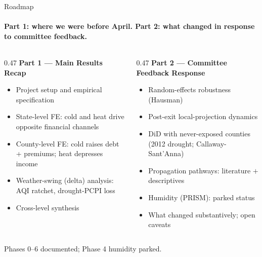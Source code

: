\documentclass[aspectratio=169,11pt]{beamer}
\newcommand{\tealtext}[1]{{\color{Teal}#1}}
\newcommand{\graytext}[1]{{\color{WarmGray}#1}}
\begin{document}
\begin{frame}{Roadmap}
  \framesubtitle{Part 1: where we were before April. Part 2: what changed in response to committee feedback.}
  \begin{columns}[T]
    \begin{column}{0.47\textwidth}
      \textbf{\tealtext{Part 1 --- Main Results Recap}}
      \begin{itemize}\itemsep0.16em
        \item Project setup and empirical specification
        \item State-level FE: cold and heat drive opposite financial channels
        \item County-level FE: cold raises debt + premiums; heat depresses income
        \item Weather-swing (delta) analysis: AQI ratchet, drought-PCPI loss
        \item Cross-level synthesis
      \end{itemize}
    \end{column}
    \begin{column}{0.47\textwidth}
      \textbf{\tealtext{Part 2 --- Committee Feedback Response}}
      \begin{itemize}\itemsep0.16em
        \item Random-effects robustness (Hausman)
        \item Post-exit local-projection dynamics
        \item DiD with never-exposed counties (2012 drought; Callaway-Sant'Anna)
        \item Propagation pathways: literature \(+\) descriptives
        \item Humidity (PRISM): parked status
        \item What changed substantively; open caveats
      \end{itemize}
    \end{column}
  \end{columns}
  \vspace{0.2em}
  \begin{center}
    \graytext{\scriptsize Phases 0--6 documented; Phase 4 humidity parked.}
  \end{center}
\end{frame}
\end{document}
